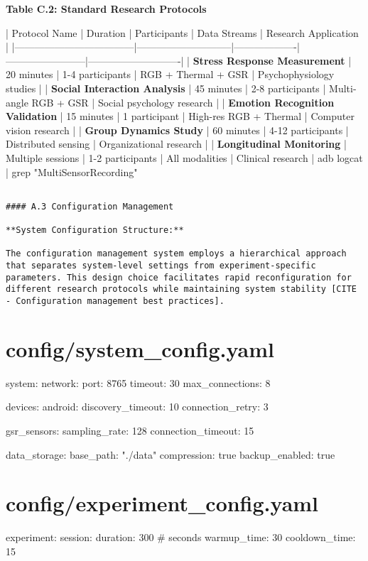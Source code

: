 \documentclass[11pt,a4paper]{article}
\begin{document}
\textbf{Table C.2: Standard Research Protocols}

| Protocol Name                      | Duration                    | Participants      | Data Streams           | Research Application       |
|------------------------------------|-----------------------------|-------------------|------------------------|----------------------------|
| \textbf{Stress Response Measurement}    | 20 minutes                  | 1-4 participants  | RGB + Thermal + GSR    | Psychophysiology studies   |
| \textbf{Social Interaction Analysis}    | 45 minutes                  | 2-8 participants  | Multi-angle RGB + GSR  | Social psychology research |
| \textbf{Emotion Recognition Validation} | 15 minutes                  | 1 participant     | High-res RGB + Thermal | Computer vision research   |
| \textbf{Group Dynamics Study}           | 60 minutes                  | 4-12 participants | Distributed sensing    | Organizational research    |
| \textbf{Longitudinal Monitoring}        | Multiple sessions           | 1-2 participants  | All modalities         | Clinical research          |
 adb logcat                         | grep "MultiSensorRecording"

\begin{verbatim}

#### A.3 Configuration Management

**System Configuration Structure:**

The configuration management system employs a hierarchical approach that separates system-level settings from experiment-specific parameters. This design choice facilitates rapid reconfiguration for different research protocols while maintaining system stability [CITE - Configuration management best practices].

\end{verbatim}
\section{config/system_config.yaml}
system:
  network:
    port: 8765
    timeout: 30
    max\_connections: 8

  devices:
    android:
      discovery\_timeout: 10
      connection\_retry: 3

    gsr\_sensors:
      sampling\_rate: 128
      connection\_timeout: 15

  data\_storage:
    base\_path: "./data"
    compression: true
    backup\_enabled: true

\section{config/experiment_config.yaml}
experiment:
  session:
    duration: 300  \# seconds
    warmup\_time: 30
    cooldown\_time: 15
\end{document}
